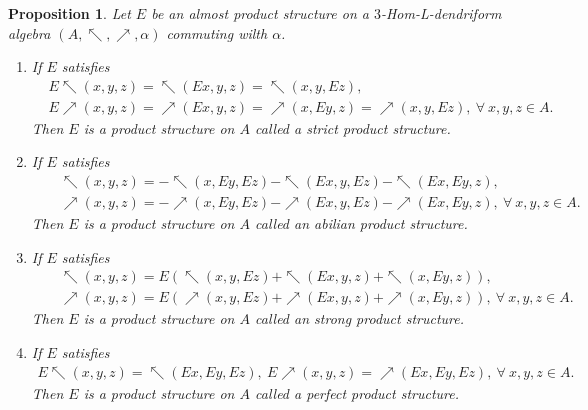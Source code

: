 \documentclass[a4paper,11pt]{article}
\def\a{\alpha}
\def\nw{\nwarrow}
\def\ne{\nearrow}
\newtheorem{pro}[thm]{Proposition}
\theoremstyle{definition}
\begin{document}
\begin{pro}
  Let $E$ be an almost product structure on a $3$-Hom-L-dendriform algebra $(A,\nw,\ne,\alpha)$ commuting wilth $\a$.
   \begin{enumerate}
     \item If $E$ satisfies
     \begin{equation}\label{abel-product-0}
     \begin{split}
&E\nw(x,y,z)=\nw(Ex,y,z)=\nw(x,y,Ez),\\
&E\ne(x,y,z)=\ne(Ex,y,z)=\ne(x,Ey,z)=\ne(x,y,Ez),\ \forall \ x,y,z\in A.
\end{split}
\end{equation}
Then $E$ is a product structure on $A$ called a strict product structure.
     \item If $E$ satisfies
     \begin{eqnarray}\label{abel-product}
&&\nw(x,y,z)=-\nw(x,Ey,Ez)-\nw(Ex,y,Ez)-\nw(Ex,Ey,z),\\&&\ne(x,y,z)=-\ne(x,Ey,Ez)-\ne(Ex,y,Ez)-\ne(Ex,Ey,z),\ \forall \ x,y,z\in A.
\end{eqnarray}
Then $E$ is a product structure on $A$ called an abilian  product structure.
 \item If $E$ satisfies
     \begin{eqnarray}
&&\nw(x,y,z)=E(\nw(x,y,Ez)+\nw(Ex,y,z)+\nw(x,Ey,z)),\\&&\ne(x,y,z)=E(\ne(x,y,Ez)+\ne(Ex,y,z)+\ne(x,Ey,z)),\ \forall \ x,y,z\in A.
\end{eqnarray}
Then $E$ is a product structure on $A$ called an strong  product structure.
\item If $E$ satisfies
     \begin{eqnarray}\label{abel-product-0}
E\nw(x,y,z)=\nw(Ex,Ey,Ez),\ E\ne(x,y,z)=\ne(Ex,Ey,Ez),\ \forall \ x,y,z\in A.
\end{eqnarray}
Then $E$ is a product structure on $A$ called a perfect product structure.

   \end{enumerate}\end{pro}
\end{document}
